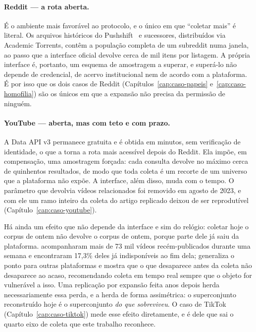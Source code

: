 \paragraph{Reddit — a rota aberta.} É o ambiente mais favorável ao protocolo, e o
único em que ``coletar mais'' é literal. Os arquivos históricos do
Pushshift~\cite{baumgartner2020pushshift} e sucessores, distribuídos via Academic
Torrents, contêm a população completa de um subreddit numa janela, ao passo que a
interface oficial devolve cerca de mil itens por listagem. A própria interface é,
portanto, um esquema de amostragem a superar, e superá-lo não depende de
credencial, de acervo institucional nem de acordo com a plataforma. É por isso que
os dois casos de Reddit (Capítulos~\ref{cap:caso-papeis} e~\ref{cap:caso-homofilia}) são os únicos em que a
expansão não precisa da permissão de ninguém.

\paragraph{YouTube — aberta, mas com teto e com prazo.} A Data API v3 permanece
gratuita e é obtida em minutos, sem verificação de identidade, o que a torna a rota
mais acessível depois do Reddit. Ela impõe, em compensação, uma amostragem
forçada: cada consulta devolve no máximo cerca de quinhentos resultados, de modo
que toda coleta é um recorte de um universo que a plataforma não expõe. A
interface, além disso, muda com o tempo. O parâmetro que devolvia vídeos relacionados foi
removido em agosto de 2023, e com ele um ramo inteiro da coleta do artigo replicado
deixou de ser reprodutível (Capítulo~\ref{cap:caso-youtube}).

Há ainda um efeito que não depende da interface e sim do relógio: coletar hoje o
corpus de ontem não devolve o corpus de ontem, porque parte dele já saiu da
plataforma.  acompanharam mais de 73 mil vídeos
recém-publicados durante uma semana e encontraram 17,3\% deles já indisponíveis ao
fim dela;  generaliza o ponto para outras
plataformas e mostra que o que desaparece antes da coleta não desaparece ao acaso,
recomendando coleta em tempo real sempre que o objeto for vulnerável a isso. Uma
replicação por expansão feita anos depois herda necessariamente essa perda, e a
herda de forma assimétrica: o superconjunto reconstruído hoje é o superconjunto
\emph{do que sobreviveu}. O caso de TikTok (Capítulo~\ref{cap:caso-tiktok}) mede
esse efeito diretamente, e é dele que sai o quarto eixo de coleta que este trabalho
reconhece.

